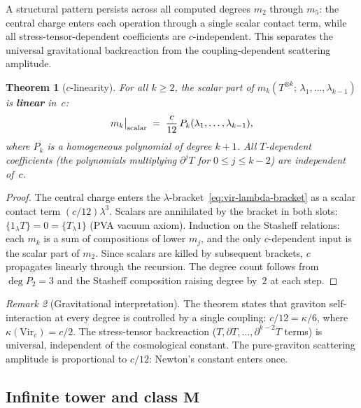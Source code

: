 \documentclass[11pt,reqno]{amsart}
\newtheorem{theorem}{Theorem}[section]
\theoremstyle{definition}
\theoremstyle{remark}
\newtheorem{remark}[theorem]{Remark}
\begin{document}
A structural pattern persists across all computed degrees
$m_2$ through $m_5$: the central charge enters each operation through
a single scalar contact term, while all stress-tensor-dependent
coefficients are $c$-independent. This separates the universal
gravitational backreaction from the coupling-dependent scattering
amplitude.

\begin{theorem}[$c$-linearity]
\label{thm:c-linearity}
For all\/ $k \ge 2$, the scalar part of\/
$m_k(T^{\otimes k};\,\lambda_1, \ldots, \lambda_{k-1})$ is
\textbf{linear} in~$c$:
\begin{equation}\label{eq:c-linearity}
m_k\big|_{\textup{scalar}}
\;=\;
\frac{c}{12}\,P_k(\lambda_1, \ldots, \lambda_{k-1}),
\end{equation}
where $P_k$ is a homogeneous polynomial of degree $k+1$.
All\/ $T$-dependent coefficients (the polynomials multiplying\/
$\partial^j T$ for $0 \le j \le k-2$) are independent of~$c$.
\end{theorem}

\begin{proof}
The central charge enters the $\lambda$-bracket~\eqref{eq:vir-lambda-bracket}
as a scalar contact term $(c/12)\lambda^3$. Scalars are
annihilated by the bracket in both slots:
$\{1{}_\lambda T\} = 0 = \{T{}_\lambda 1\}$ (PVA vacuum axiom).
Induction on the Stasheff relations: each $m_k$ is a sum of
compositions of lower $m_j$, and the only $c$-dependent input is the
scalar part of $m_2$. Since scalars are killed by subsequent brackets,
$c$ propagates linearly through the recursion. The degree count
follows from $\deg P_2 = 3$ and the Stasheff composition raising
degree by~$2$ at each step.
\end{proof}

\begin{remark}[Gravitational interpretation]
The theorem states that graviton self-interaction at every degree is
controlled by a single coupling: $c/12 = \kappa/6$, where
$\kappa(\mathrm{Vir}_c) = c/2$. The stress-tensor backreaction
($T, \partial T, \ldots, \partial^{k-2}T$ terms) is universal,
independent of the cosmological constant. The pure-graviton
scattering amplitude is proportional to $c/12$: Newton's constant
enters once.
\end{remark}

\subsection{Infinite tower and class $\mathbf{M}$}
\end{document}
